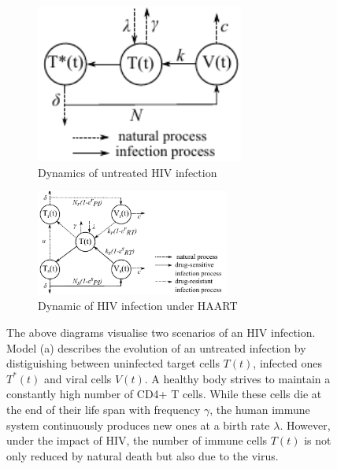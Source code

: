 \begin{figure}
    \centering
    \begin{subfigure}[b]{0.3\textwidth}
        \centering
        \includegraphics[width=0.75\textwidth]{images/infection_scheme/untreated_infection.pdf}
        \caption[]%
        {{\small Dynamics of untreated HIV infection}}    
        \label{fig0a:scheme_pretreatment}
    \end{subfigure}
    \begin{subfigure}[b]{0.625\textwidth}   
        \centering 
        \includegraphics[width=0.7\textwidth]{images/infection_scheme/treated_infection.pdf}
        \caption[]%
        {{\small Dynamic of HIV infection under HAART}}    
        \label{fig0b:scheme_treated}
    \end{subfigure}
    \caption[]{The above diagrams visualise two scenarios of an HIV infection.
    Model (a) describes the evolution of an untreated infection by distiguishing between uninfected target cells $T(t)$, infected ones $T^*(t)$ and viral cells $V(t)$.
    A healthy body strives to maintain a constantly high number of CD4+ T cells.
    While these cells die at the end of their life span with frequency $\gamma$, the human immune system continuously produces new ones at a birth rate $\lambda$.
    However, under the impact of HIV, the number of immune cells $T(t)$ is not only reduced by natural death but also due to the virus.
}
\end{figure}
